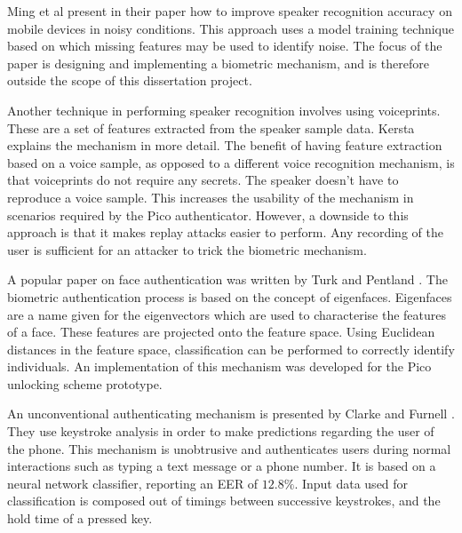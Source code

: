 Ming et al \cite{ming2007robust} present in their paper how to improve speaker recognition accuracy on mobile devices in noisy conditions. This approach uses a model training technique based on which missing features may be used to identify noise. The focus of the paper is designing and implementing a biometric mechanism, and is therefore outside the scope of this dissertation project. 

Another technique in performing speaker recognition involves using voiceprints. These are a set of features extracted from the speaker sample data. Kersta \cite{kersta2005voiceprint} explains the mechanism in more detail. The benefit of having feature extraction based on a voice sample, as opposed to a different voice recognition mechanism, is that voiceprints do not require any secrets. The speaker doesn't have to reproduce a voice sample. This increases the usability of the mechanism in scenarios required by the Pico authenticator. However, a downside to this approach is that it makes replay attacks easier to perform. Any recording of the user is sufficient for an attacker to trick the biometric mechanism.

A popular paper on face authentication was written by Turk and Pentland \cite{turk1991face}. The biometric authentication process is based on the concept of eigenfaces. Eigenfaces are a name given for the eigenvectors which are used to characterise the features of a face. These features are projected onto the feature space. Using Euclidean distances in the feature space, classification can be performed to correctly identify individuals. An implementation of this mechanism was developed for the Pico unlocking scheme prototype.

An unconventional authenticating mechanism is presented by Clarke and Furnell \cite{clarke2007authenticating}. They use keystroke analysis in order to make predictions regarding the user of the phone. This mechanism is unobtrusive and authenticates users during normal interactions such as typing a text message or a phone number. It is based on a neural network classifier, reporting an EER of $12.8\%$. Input data used for classification is composed out of timings between successive keystrokes, and the hold time of a pressed key. 







